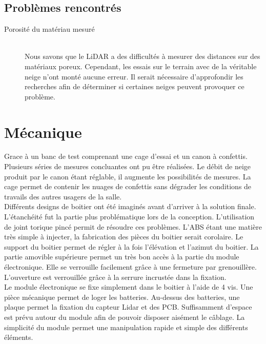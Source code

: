 \subsection{Problèmes rencontrés}

\begin{description}
    \item[Porosité du matériau mesuré] \hfill \\ 
    Nous savons que le LiDAR a des difficultés à mesurer des distances sur des matériaux poreux. Cependant,
    les essais sur le terrain avec de la véritable neige n'ont monté aucune erreur. Il serait nécessaire
    d'approfondir les recherches afin de déterminer si certaines neiges peuvent provoquer ce problème.
\end{description}

\section{Mécanique}
Grace à un banc de test comprenant une cage d’essai et un canon à confettis. Plusieurs séries de mesures 
concluantes ont pu être réalisées. Le débit de neige produit par le canon étant réglable, il augmente les 
possibilités de mesures. La cage permet de contenir les nuages de confettis sans dégrader les conditions 
de travails des autres usagers de la salle.\\
Différents designs de boitier ont été imaginés avant d’arriver à la solution finale. L’étanchéité fut la 
partie plus problématique lors de la conception. L’utilisation de joint torique pincé permit de résoudre 
ces problèmes. L’ABS étant une matière très simple à injecter, la fabrication des pièces du boitier serait 
corolaire. Le support du boitier permet de régler à la fois l’élévation et l’azimut du boitier. La partie 
amovible supérieure permet un très bon accès à la partie du module électronique. Elle se verrouille facilement 
grâce à une fermeture par grenouillère. L’ouverture est verrouillée grâce à la serrure incrustée dans la 
fixation.\\
Le module électronique se fixe simplement dans le boitier à l’aide de 4 vis. Une pièce mécanique permet 
de loger les batteries. Au-dessus des batteries, une plaque permet la fixation du capteur Lidar 
et des PCB. Suffisamment d’espace est prévu autour du module afin de pouvoir disposer aisément le câblage. 
La simplicité du module permet une manipulation rapide et simple des différents éléments.